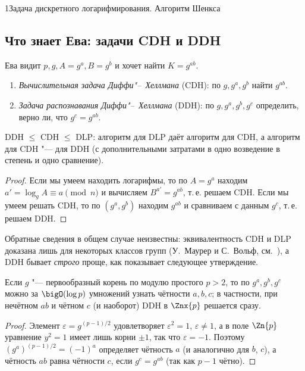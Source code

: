 \begin{lecture}{1}{Задача дискретного логарифмирования. Алгоритм Шенкса}

\subsection{Что знает Ева: задачи CDH и DDH}

Ева видит $p, g, A = g^a, B = g^b$ и хочет найти $K = g^{ab}$.

\begin{definition}
\begin{enumerate}
  \item \emph{Вычислительная задача Диффи"--~Хеллмана} (CDH): по $g, g^a, g^b$ найти $g^{ab}$.
  \item \emph{Задача распознавания Диффи"--~Хеллмана} (DDH): по $g, g^a, g^b, g^c$ определить,
    верно ли, что $g^c = g^{ab}$.
\end{enumerate}
\end{definition}

\begin{proposition}\label{l1:reductions}
DDH $\le$ CDH $\le$ DLP: алгоритм для DLP даёт алгоритм для CDH, а алгоритм для CDH "--- для DDH
(с дополнительными затратами в одно возведение в степень и одно сравнение).
\end{proposition}

\begin{proof}
Если мы умеем находить логарифмы, то по $A = g^a$ находим $a' = \log_g A \equiv a \pmod n$
и вычисляем $B^{a'} = g^{ab}$, т.\,е. решаем CDH. Если мы умеем решать CDH, то по $(g^a, g^b)$
находим $g^{ab}$ и сравниваем с данным $g^c$, т.\,е. решаем DDH.
\end{proof}

Обратные сведения в общем случае неизвестны: эквивалентность CDH и DLP доказана лишь для
некоторых классов групп (У.~Маурер и С.~Вольф, см.~\cite[гл.~21]{galbraith}), а DDH бывает
\emph{строго} проще, как показывает следующее утверждение.

\begin{proposition}\label{l1:ddh-easy}
Если $g$ "--- первообразный корень по модулю простого $p > 2$, то по $g^a, g^b, g^c$ можно за
$\bigO(\log p)$ умножений узнать чётности $a, b, c$; в частности, при нечётном $ab$ и чётном $c$
(и наоборот) DDH в $\Znx{p}$ решается сразу.
\end{proposition}

\begin{proof}
Элемент $\varepsilon = g^{(p-1)/2}$ удовлетворяет $\varepsilon^2 = 1$, $\varepsilon \ne 1$, а в поле
$\Zn{p}$ уравнение $y^2 = 1$ имеет лишь корни $\pm 1$, так что $\varepsilon = -1$. Поэтому
$(g^a)^{(p-1)/2} = (-1)^a$ определяет чётность $a$ (и аналогично для $b$, $c$), а чётность $ab$
равна чётности $c$, если $g^c = g^{ab}$ (так как $p - 1$ чётно).
\end{proof}


\end{lecture}
